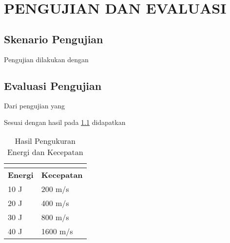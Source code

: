 \chapter{PENGUJIAN DAN EVALUASI}
\vspace{4ex}

\setlength{\parindent}{7ex}

\section{Skenario Pengujian}
\vspace{1ex}

Pengujian dilakukan dengan \lipsum[1]
\vspace{0.5ex}

\lipsum[2]
\vspace{0.5ex}

\newpage

\section{Evaluasi Pengujian}
\vspace{1ex}

Dari pengujian yang \lipsum[3]
\vspace{0.5ex}

Sesuai dengan hasil pada \ref{tb:energi_kecepatan} didapatkan \lipsum[4]

\begin{longtable}{|l|l|}
	\caption{Hasil Pengukuran Energi dan Kecepatan}
	\vspace{1.5ex}
	\label{tb:energi_kecepatan}\\
	\hline
	\rowcolor[HTML]{C0C0C0}
	\textbf{Energi} & \textbf{Kecepatan} \\ \hline
	10 J & 200 m/s \\ \hline
	20 J & 400 m/s \\ \hline
	30 J & 800 m/s \\ \hline
	40 J & 1600 m/s \\ \hline
\end{longtable}
\vspace{1ex}

\lipsum[5]
\vspace{0.5ex}
